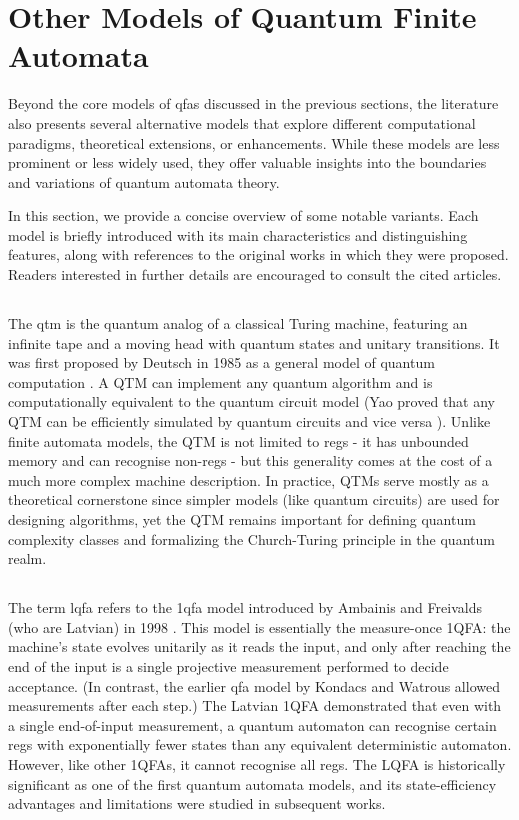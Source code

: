 \section{Other Models of Quantum Finite Automata}
\label{sec:other-models}

Beyond the core models of \glspl{qfa} discussed in the previous sections, the literature also presents several alternative models that explore different computational paradigms, theoretical extensions, or enhancements. While these models are less prominent or less widely used, they offer valuable insights into the boundaries and variations of quantum automata theory.

In this section, we provide a concise overview of some notable variants. Each model is briefly introduced with its main characteristics and distinguishing features, along with references to the original works in which they were proposed. Readers interested in further details are encouraged to consult the cited articles.

\subsection{} 
The \gls{qtm} is the quantum analog of a classical Turing machine, featuring an infinite tape and a moving head with quantum states and unitary transitions. It was first proposed by Deutsch in 1985 as a general model of quantum computation \cite{deutsch1985quantum}. A QTM can implement any quantum algorithm and is computationally equivalent to the quantum circuit model (Yao proved that any QTM can be efficiently simulated by quantum circuits and vice versa \cite{yao1993quantum}). Unlike finite automata models, the QTM is not limited to \glspl{reg} - it has unbounded memory and can recognise non-\glspl{reg} - but this generality comes at the cost of a much more complex machine description. In practice, QTMs serve mostly as a theoretical cornerstone since simpler models (like quantum circuits) are used for designing algorithms, yet the QTM remains important for defining quantum complexity classes and formalizing the Church-Turing principle in the quantum realm.

\subsection{} 
The term \gls{lqfa} refers to the \gls{1qfa} model introduced by Ambainis and Freivalds (who are Latvian) in 1998 \cite{ambainis19981}. This model is essentially the measure-once 1QFA: the machine's state evolves unitarily as it reads the input, and only after reaching the end of the input is a single projective measurement performed to decide acceptance. (In contrast, the earlier \gls{qfa} model by Kondacs and Watrous allowed measurements after each step.) The Latvian 1QFA demonstrated that even with a single end-of-input measurement, a quantum automaton can recognise certain \glspl{reg} with exponentially fewer states than any equivalent deterministic automaton. However, like other 1QFAs, it cannot recognise all \glspl{reg}. The LQFA is historically significant as one of the first quantum automata models, and its state-efficiency advantages and limitations were studied in subsequent works.

